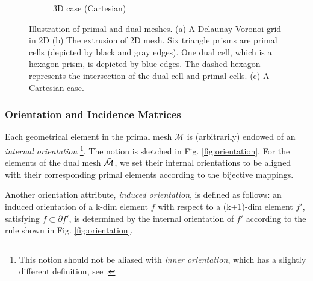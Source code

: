 \documentclass{article}
\begin{document}
\begin{figure}
\begin{subfigure}[b]{0.35\textwidth}
        \caption{3D case (Cartesian)}
        \label{fig:cartesian}
    \end{subfigure}
    \hfill
    \caption{Illustration of primal and dual meshes. (a) A Delaunay-Voronoi grid in 2D (b) The extrusion of 2D mesh. Six triangle prisms are primal cells (depicted by black and gray edges). One dual cell, which is a hexagon prism, is depicted by blue edges. The dashed hexagon represents the intersection of the dual cell and primal cells. (c) A Cartesian case.}
    \label{fig:illustration_primal_dual}
\end{figure}

\subsubsection{Orientation and Incidence Matrices}
Each geometrical element in the primal mesh $\mathcal{M}$ is (arbitrarily) endowed of an \emph{internal orientation} \footnote{This notion should not be aliased with \emph{inner orientation}, which has a slightly different definition, see \cite{tonti_2002}.}. The notion is sketched in Fig. \ref{fig:orientation}. For the elements of the dual mesh $\Tilde{\mathcal{M}}$, we set their internal orientations to be aligned with their corresponding primal elements according to the bijective mappings.

Another orientation attribute, \emph{induced orientation}, is defined as follows: an induced orientation of a k-dim element $f$ with respect to a (k+1)-dim element $f'$, satisfying $f \subset \partial f' $, is determined by the internal orientation of $f'$ according to the rule shown in Fig. \ref{fig:orientation}. 
\end{document}

